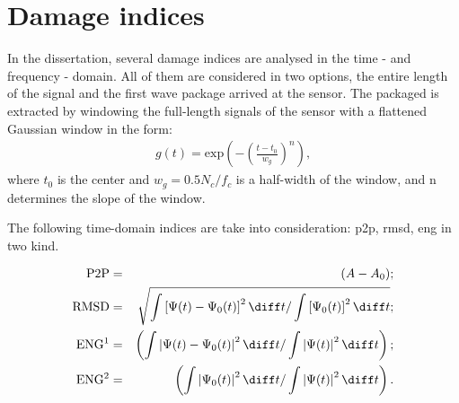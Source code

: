 \section{Damage indices}
\label{sec:di}

In the dissertation, several damage indices are analysed in the time - and frequency - domain. All of them are considered in two options, the entire length of the signal and the first wave package arrived at the sensor.
The packaged is extracted by windowing the full-length signals of the sensor  with a flattened Gaussian window in the form:
\begin{eqnarray}
	g(t)= \mathrm{exp}\left(-\left(\frac{t-t_0}{w_g}\right) ^{n}\right),
	\label{eq:psi_g}
\end{eqnarray}
where \(t_0\) is the center and \(w_g=0.5N_c/f_c\) is a half-width of the window, and n determines the slope of the window.

The following time-domain indices are take into consideration: \ac{p2p}, \ac{rmsd}, \ac{eng} in two kind.

\begin{eqnarray}
		\mathrm{P2P} & = & (A - A_0);\\
		\mathrm{RMSD} & = & \sqrt{\int{\left[\Psi(t)-\Psi_0(t)\right]^2\diff 		t/\int{\left[\Psi_0(t)\right]^2\diff t}}};\\
		\mathrm{ENG^1} & = & \left(\int{\left|\Psi(t)-\Psi_0(t)\right|^2\diff 	t/\int{\left|\Psi(t)\right|^2\diff t}}\right);\\
		\mathrm{ENG^2} & = & \left(\int{\left|\Psi_0(t)\right|^2\diff 	t/\int{\left|\Psi(t)\right|^2\diff t}}\right).
\end{eqnarray}

%
